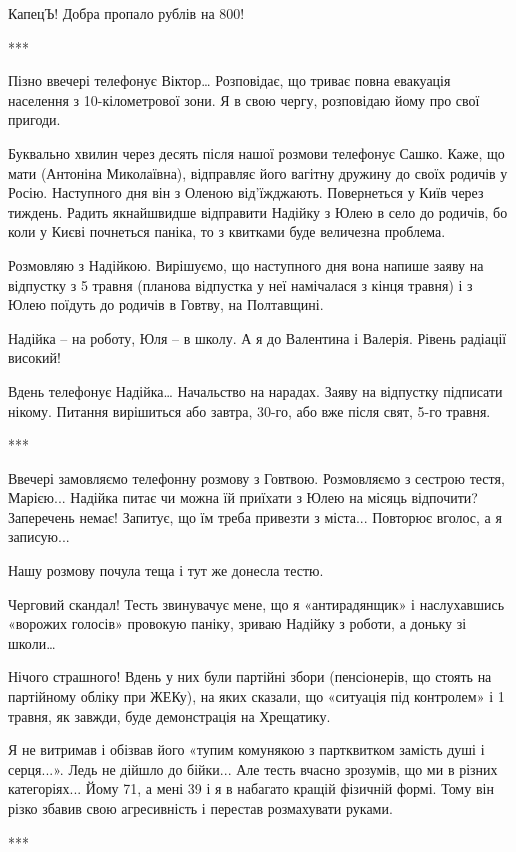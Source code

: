 КапецЪ! Добра пропало рублів на 800! 

***

Пізно ввечері телефонує Віктор… Розповідає, що триває повна евакуація населення
з 10-кілометрової зони. Я в свою чергу, розповідаю йому про свої пригоди. 

Буквально хвилин через десять після нашої розмови телефонує Сашко. Каже, що
мати (Антоніна Миколаївна), відправляє його вагітну дружину до своїх родичів у
Росію. Наступного дня він з Оленою від’їжджають. Повернеться у Київ через
тиждень. Радить якнайшвидше відправити Надійку з Юлею в село до родичів, бо
коли у Києві почнеться паніка, то з квитками буде величезна проблема.

Розмовляю з Надійкою. Вирішуємо, що наступного дня вона напише заяву на
відпустку з 5 травня (планова відпустка у неї намічалася з кінця травня) і з
Юлею поїдуть до родичів в Говтву, на Полтавщині. 


Надійка – на роботу, Юля – в школу. А я до Валентина і Валерія. Рівень радіації
високий!

Вдень телефонує Надійка… Начальство на нарадах. Заяву на відпустку підписати
нікому. Питання вирішиться або завтра, 30-го, або вже після свят, 5-го травня. 

***

Ввечері замовляємо телефонну розмову з Говтвою. Розмовляємо з сестрою тестя,
Марією... Надійка питає чи можна їй приїхати з Юлею на місяць відпочити?
Заперечень немає! Запитує, що їм треба привезти з міста... Повторює вголос, а я
записую...

Нашу розмову почула теща і тут же донесла тестю. 

Черговий скандал! Тесть звинувачує мене, що я «антирадянщик» і наслухавшись
«ворожих голосів» провокую паніку, зриваю Надійку з роботи, а доньку зі школи… 

Нічого страшного! Вдень у них були партійні збори (пенсіонерів, що стоять на
партійному обліку при ЖЕКу), на яких сказали, що «ситуація під контролем» і 1
травня, як завжди, буде демонстрація на Хрещатику.

Я не витримав і обізвав його «тупим комунякою з партквитком замість душі і
серця...». Ледь не дійшло до бійки... Але тесть вчасно зрозумів, що ми в різних
категоріях... Йому 71, а мені 39 і я в набагато кращій фізичній формі. Тому він
різко збавив свою агресивність і перестав розмахувати руками. 

***


